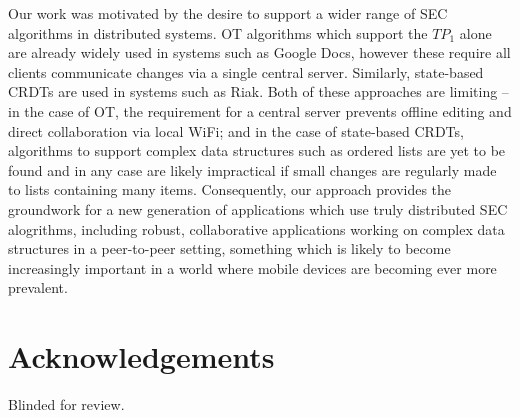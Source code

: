 \documentclass[acmlarge,review,anonymous]{acmart}\settopmatter{printfolios=true}
\begin{document}
Our work was motivated by the desire to support a wider range of SEC algorithms in distributed systems. OT algorithms which support the $\mathit{TP}_1$ alone are already widely used in systems such as Google Docs, however these require all clients communicate changes via a single central server. Similarly, state-based CRDTs are used in systems such as Riak. Both of these approaches are limiting -- in the case of OT, the requirement for a central server prevents offline editing and direct collaboration via local WiFi; and in the case of state-based CRDTs, algorithms to support complex data structures such as ordered lists are yet to be found and in any case are likely impractical if small changes are regularly made to lists containing many items. Consequently, our approach provides the groundwork for a new generation of applications which use truly distributed SEC alogrithms, including robust, collaborative applications working on complex data structures in a peer-to-peer setting, something which is likely to become increasingly important in a world where mobile devices are becoming ever more prevalent.

\section*{Acknowledgements}

Blinded for review.


{}


\end{document}

